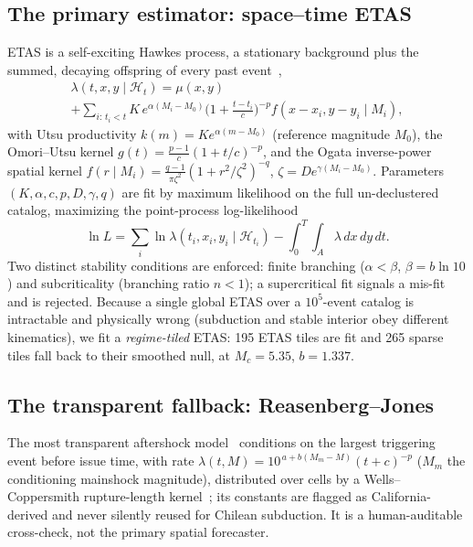 \documentclass[journal]{IEEEtran}
\begin{document}
\subsection{The primary estimator: space--time ETAS}

ETAS is a self-exciting Hawkes process, a stationary background plus the summed, decaying
offspring of every past event~\cite{ogata1998},
\begin{multline}
\lambda(t,x,y\mid\mathcal H_t)=\mu(x,y)\\
+\sum_{i:\,t_i<t} K\,e^{\alpha(M_i-M_0)}
\Big(1+\tfrac{t-t_i}{c}\Big)^{-p} f(x-x_i,y-y_i\mid M_i),
\end{multline}
with Utsu productivity $k(m)=K e^{\alpha(m-M_0)}$ (reference magnitude $M_0$), the Omori--Utsu kernel
$g(t)=\tfrac{p-1}{c}(1+t/c)^{-p}$, and the Ogata inverse-power spatial kernel
$f(r\mid M_i)=\tfrac{q-1}{\pi\zeta^2}(1+r^2/\zeta^2)^{-q}$, $\zeta=De^{\gamma(M_i-M_0)}$.
Parameters $(K,\alpha,c,p,D,\gamma,q)$ are fit by maximum likelihood on the full
un-declustered catalog, maximizing the point-process log-likelihood
\begin{equation}
\ln L=\sum_i\ln\lambda(t_i,x_i,y_i\mid\mathcal H_{t_i})-\!\int_0^T\!\!\!\int_A\!\lambda\,dx\,dy\,dt.
\end{equation}
Two distinct stability conditions are enforced: finite branching ($\alpha<\beta$, $\beta=b\ln10$)
and subcriticality (branching ratio $n<1$); a supercritical fit signals a mis-fit and is
rejected. Because a single global ETAS over a $10^5$-event catalog is intractable and
physically wrong (subduction and stable interior obey different kinematics), we fit a
\emph{regime-tiled} ETAS: 195 ETAS tiles are fit and 265 sparse tiles fall back to their
smoothed null, at $M_c=5.35$, $b=1.337$.

\subsection{The transparent fallback: Reasenberg--Jones}

The most transparent aftershock model~\cite{reasenberg1989,page2016} conditions on the
largest triggering event before issue time, with rate
$\lambda(t,M)=10^{\,a+b(M_m-M)}(t+c)^{-p}$ ($M_m$ the conditioning mainshock magnitude),
distributed over cells by a Wells--Coppersmith
rupture-length kernel~\cite{wells1994}; its constants are flagged as California-derived and
never silently reused for Chilean subduction. It is a human-auditable cross-check, not the
primary spatial forecaster.
\end{document}
